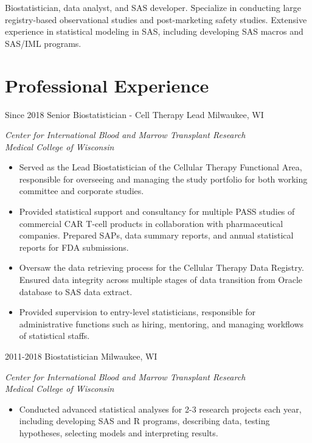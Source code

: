 Biostatistician, data analyst, and SAS developer. Specialize in conducting large registry-based observational studies and post-marketing safety studies. Extensive experience in statistical modeling in SAS, including developing SAS macros and SAS/IML programs.\\

\section{Professional Experience}

\begin{entrylist}
  \entry
    {Since 2018}
    {Senior Biostatistician - Cell Therapy Lead}
    {Milwaukee, WI}
    {
      \textit{Center for International Blood and Marrow Transplant Research \\ Medical College of Wisconsin}
      \begin{itemize}
        \item Served as the Lead Biostatistician of the Cellular Therapy Functional Area, responsible for overseeing and managing the study portfolio for both working committee and corporate studies.
        \item Provided statistical support and consultancy for multiple PASS studies of commercial CAR T-cell products in collaboration with pharmaceutical companies. Prepared SAPs, data summary reports, and annual statistical reports for FDA submissions.
        \item Oversaw the data retrieving process for the Cellular Therapy Data Registry. Ensured data integrity across multiple stages of data transition from Oracle database to SAS data extract.
        \item Provided supervision to entry-level statisticians, responsible for administrative functions such as hiring, mentoring, and managing workflows of statistical staffs.
      \end{itemize}
    }
  \entry
    {2011-2018}
    {Biostatistician}
    {Milwaukee, WI}
    {
      \textit{Center for International Blood and Marrow Transplant Research \\ Medical College of Wisconsin}
      \begin{itemize}
        \item Conducted advanced statistical analyses for 2-3 research projects each year, including developing SAS and R programs, describing data, testing hypotheses, selecting models and interpreting results.

\end{itemize}}
\end{entrylist}
